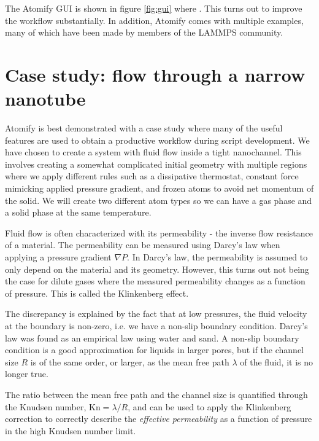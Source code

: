 \documentclass[12pt,a4paper,final]{iopart}
\begin{document}
The Atomify GUI is shown in figure \ref{fig:gui} where .
This turns out to improve the workflow substantially.
In addition, Atomify comes with multiple examples,
many of which have been made by members of the LAMMPS community.

\section{\label{sec:casestudy}Case study: flow through a narrow nanotube}
Atomify is best demonstrated with a case study where many of
the useful features are used to obtain a productive workflow during script development.
We have chosen to create a system with fluid flow inside a tight nanochannel.
This involves creating a somewhat complicated initial geometry with multiple regions
where we apply different rules such as a dissipative thermostat, constant force mimicking
applied pressure gradient, and frozen atoms to avoid net momentum of the solid.
We will create two different atom types so we can have a gas phase and a solid phase at the same temperature.

Fluid flow is often characterized with its permeability - the inverse flow resistance of a material.
The permeability can be measured using Darcy's law when applying a pressure gradient $\nabla P$.
In Darcy's law, the permeability is assumed to only depend on the material and its geometry.
However, this turns out not being the case for dilute
gases where the measured permeability changes as a function of pressure\cite{klinkenberg1941permeability}.
This is called the Klinkenberg effect.

The discrepancy is explained by the fact that at low pressures, the fluid velocity
at the boundary is non-zero, i.e. we have a non-slip boundary condition.
Darcy's law was found as an empirical law using water and sand.
A non-slip boundary condition is a good approximation for liquids in larger pores,
but if the channel size $R$ is of the same order,
or larger, as the mean free path $\lambda$ of the fluid, it is no longer true.

The ratio between the mean free path and the channel size is quantified through
the Knudsen number, $\text{Kn} = \lambda / R$, and can be used to apply the Klinkenberg correction\cite{klinkenberg1941permeability}
to correctly describe the \textit{effective permeability} as a function of pressure in the high Knudsen number limit.
\end{document}
